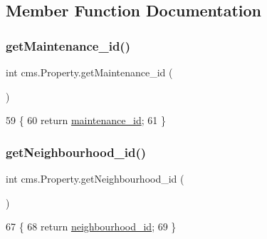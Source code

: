 \subsection{Member Function Documentation}
\mbox{\label{classcms_1_1_property_aeafbbef3deb1c073082ee3f686f38191}} 
\subsubsection{\texorpdfstring{get\+Maintenance\+\_\+id()}{getMaintenance\_id()}}
{\footnotesize\ttfamily int cms.\+Property.\+get\+Maintenance\+\_\+id (\begin{DoxyParamCaption}{ }\end{DoxyParamCaption})\hspace{0.3cm}{\ttfamily [inline]}}


\begin{DoxyCode}
59                                    \{
60         \textcolor{keywordflow}{return} \mbox{\hyperlink{classcms_1_1_property_a8da95f059e18d03376e179cbe5861043}{maintenance\_id}};
61     \}
\end{DoxyCode}
\mbox{\label{classcms_1_1_property_a3ba973134882b53005aff159a4c858d6}} 
\subsubsection{\texorpdfstring{get\+Neighbourhood\+\_\+id()}{getNeighbourhood\_id()}}
{\footnotesize\ttfamily int cms.\+Property.\+get\+Neighbourhood\+\_\+id (\begin{DoxyParamCaption}{ }\end{DoxyParamCaption})\hspace{0.3cm}{\ttfamily [inline]}}


\begin{DoxyCode}
67                                      \{
68         \textcolor{keywordflow}{return} \mbox{\hyperlink{classcms_1_1_property_a68a7a76b323d88f8ddcc351265e7fd25}{neighbourhood\_id}};
69     \}
\end{DoxyCode}
\mbox{\label{classcms_1_1_property_a92087914fe229f07d08e5ee4935d076d}} 

